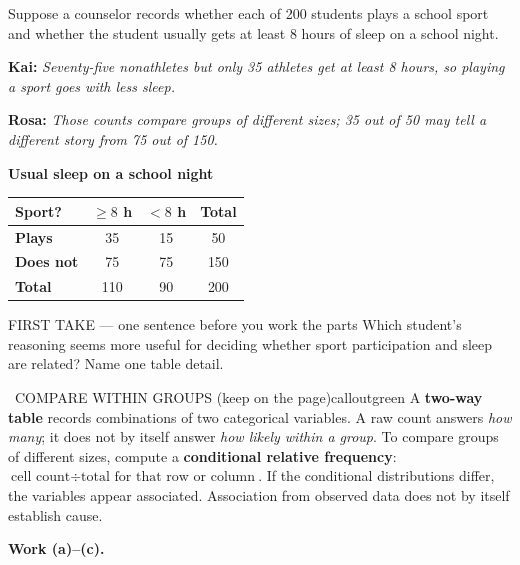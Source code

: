 \documentclass[11pt]{article}
\begin{document}


Suppose a counselor records whether each of 200 students plays a school sport and whether the student usually gets at least 8 hours of sleep on a school night.\par\smallskip \textbf{Kai:} \emph{Seventy-five nonathletes but only 35 athletes get at least 8 hours, so playing a sport goes with less sleep.}\par \textbf{Rosa:} \emph{Those counts compare groups of different sizes; 35 out of 50 may tell a different story from 75 out of 150.}\par
\begin{center}
\textbf{Usual sleep on a school night}\par\smallskip
\begin{tabular}{|l|c|c|c|}
\hline
\textbf{Sport?} & \textbf{$\geq 8$ h} & \textbf{$<8$ h} & \textbf{Total} \\ \hline
\textbf{Plays} & 35 & 15 & 50 \\ \hline
\textbf{Does not} & 75 & 75 & 150 \\ \hline
\textbf{Total} & 110 & 90 & 200 \\ \hline
\end{tabular}
\end{center}
\begin{firsttakebox}{FIRST TAKE --- one sentence before you work the parts}
Which student's reasoning seems more useful for deciding whether sport participation and sleep are related? Name one table detail.
\workspace{0.9in}
\end{firsttakebox}

\begin{callout}{\IconBook\ COMPARE WITHIN GROUPS (keep on the page)}{calloutgreen}
A \textbf{two-way table} records combinations of two categorical variables. A raw count answers
\emph{how many}; it does not by itself answer \emph{how likely within a group}. To compare groups of
different sizes, compute a \textbf{conditional relative frequency}:
$\text{cell count}\div\text{total for that row or column}$. If the conditional distributions differ,
the variables appear associated. Association from observed data does not by itself establish cause.
\end{callout}

\newpage
\textbf{Work (a)--(c).}\par\smallskip
\end{document}
